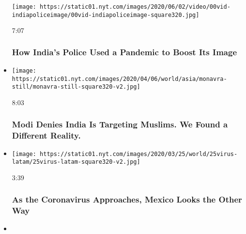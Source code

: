 \begin{itemize}
  \texttt{[image: https://static01.nyt.com/images/2020/06/02/video/00vid-indiapoliceimage/00vid-indiapoliceimage-square320.jpg]}

  7:07

  \hypertarget{how-indias-police-used-a-pandemic-to-boost-its-image}{%
  \subsubsection{How India's Police Used a Pandemic to Boost Its
  Image}\label{how-indias-police-used-a-pandemic-to-boost-its-image}}
\item
  \href{https://www.nytimes.com/video/world/asia/100000006963057/modi-muslims-india-citizenship-test.html?action=click\&module=video-series-bar\&region=header\&pgtype=Article\&playlistId=video/on-the-ground}{}

  \texttt{[image: https://static01.nyt.com/images/2020/04/06/world/asia/monavra-still/monavra-still-square320-v2.jpg]}

  8:03

  \hypertarget{modi-denies-india-is-targeting-muslims-we-found-a-different-reality}{%
  \subsubsection{Modi Denies India Is Targeting Muslims. We Found a
  Different
  Reality.}\label{modi-denies-india-is-targeting-muslims-we-found-a-different-reality}}
\item
  \href{https://www.nytimes.com/video/world/americas/100000007049738/as-coronavirus-approaches-mexico-president-looks-other-way.html?action=click\&module=video-series-bar\&region=header\&pgtype=Article\&playlistId=video/on-the-ground}{}

  \texttt{[image: https://static01.nyt.com/images/2020/03/25/world/25virus-latam/25virus-latam-square320-v2.jpg]}

  3:39

  \hypertarget{as-the-coronavirus-approaches-mexico-looks-the-other-way}{%
  \subsubsection{As the Coronavirus Approaches, Mexico Looks the Other
  Way}\label{as-the-coronavirus-approaches-mexico-looks-the-other-way}}
\item
  \href{https://www.nytimes.com/video/world/americas/100000007011912/us-guatemela-asylum.html?action=click\&module=video-series-bar\&region=header\&pgtype=Article\&playlistId=video/on-the-ground}{}


\end{itemize}
